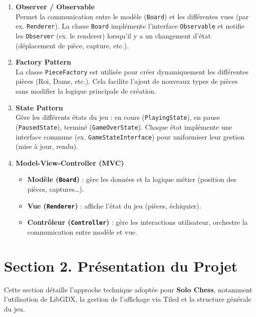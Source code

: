 \documentclass[11pt,a4paper]{article}
\begin{document}
\begin{enumerate}[label=\arabic*.]
    \item \textbf{Observer / Observable}\\
    Permet la communication entre le modèle (\texttt{Board}) et les différentes vues (par ex. \texttt{Renderer}). La classe \texttt{Board} implémente l’interface \texttt{Observable} et notifie les \texttt{Observer} (ex. le renderer) lorsqu’il y a un changement d’état (déplacement de pièce, capture, etc.).

    \item \textbf{Factory Pattern}\\
    La classe \texttt{PieceFactory} est utilisée pour créer dynamiquement les différentes pièces (Roi, Dame, etc.). Cela facilite l’ajout de nouveaux types de pièces sans modifier la logique principale de création.

    \item \textbf{State Pattern}\\
    Gère les différents états du jeu : en cours (\texttt{PlayingState}), en pause (\texttt{PausedState}), terminé (\texttt{GameOverState}). Chaque état implémente une interface commune (ex. \texttt{GameStateInterface}) pour uniformiser leur gestion (mise à jour, rendu).

    \item \textbf{Model-View-Controller (MVC)}\\
    \begin{itemize}
        \item \textbf{Modèle (\texttt{Board})} : gère les données et la logique métier (position des pièces, captures…).
        \item \textbf{Vue (\texttt{Renderer})} : affiche l’état du jeu (pièces, échiquier).
        \item \textbf{Contrôleur (\texttt{Controller})} : gère les interactions utilisateur, orchestre la communication entre modèle et vue.
    \end{itemize}
\end{enumerate}

\section*{Section 2. Présentation du Projet}

Cette section détaille l’approche technique adoptée pour \textbf{Solo Chess}, notamment l’utilisation de LibGDX, la gestion de l’affichage via Tiled et la structure générale du jeu.
\end{document}
